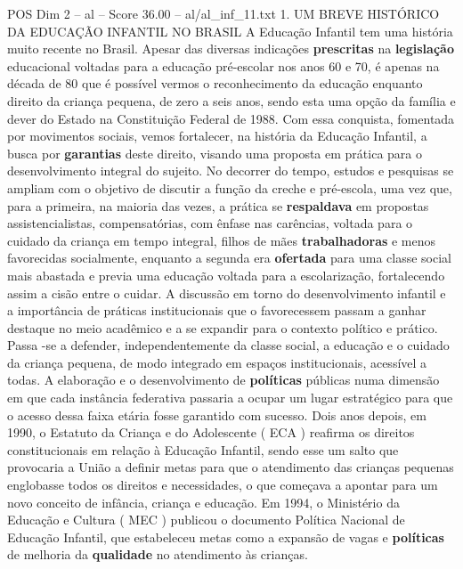 \begin{textsample}{POS Dim 2 – al – Score 36.00 – al/al\_inf\_11.txt}  \label{ex:f2_pos_261}
1.
UM BREVE HISTÓRICO DA EDUCAÇÃO INFANTIL NO BRASIL A Educação Infantil tem uma história muito recente no Brasil.
Apesar das diversas indicações \textbf{prescritas} na \textbf{legislação} educacional voltadas para a educação pré-escolar nos anos 60 e 70, é apenas na década de 80 que é possível vermos o reconhecimento da educação enquanto direito da criança pequena, de zero a seis anos, sendo esta uma opção da família e dever do Estado na Constituição Federal de 1988.
Com essa conquista, fomentada por movimentos sociais, vemos fortalecer, na história da Educação Infantil, a busca por \textbf{garantias} deste direito, visando uma proposta em prática para o desenvolvimento integral do sujeito.
No decorrer do tempo, estudos e pesquisas se ampliam com o objetivo de discutir a função da creche e pré-escola, uma vez que, para a primeira, na maioria das vezes, a prática se \textbf{respaldava} em propostas assistencialistas, compensatórias, com ênfase nas carências, voltada para o cuidado da criança em tempo integral, filhos de mães \textbf{trabalhadoras} e menos favorecidas socialmente, enquanto a segunda era \textbf{ofertada} para uma classe social mais abastada e previa uma educação voltada para a escolarização, fortalecendo assim a cisão entre o cuidar.
A discussão em torno do desenvolvimento infantil e a importância de práticas institucionais que o favorecessem passam a ganhar destaque no meio acadêmico e a se expandir para o contexto político e prático.
Passa -se a defender, independentemente da classe social, a educação e o cuidado da criança pequena, de modo integrado em espaços institucionais, acessível a todas.
A elaboração e o desenvolvimento de \textbf{políticas} públicas numa dimensão em que cada instância federativa passaria a ocupar um lugar estratégico para que o acesso dessa faixa etária fosse garantido com sucesso.
Dois anos depois, em 1990, o Estatuto da Criança e do Adolescente ( ECA ) reafirma os direitos constitucionais em relação à Educação Infantil, sendo esse um salto que provocaria a União a definir metas para que o atendimento das crianças pequenas englobasse todos os direitos e necessidades, o que começava a apontar para um novo conceito de infância, criança e educação.
Em 1994, o Ministério da Educação e Cultura ( MEC ) publicou o documento Política Nacional de Educação Infantil, que estabeleceu metas como a expansão de vagas e \textbf{políticas} de melhoria da \textbf{qualidade} no atendimento às crianças.

\end{textsample}
